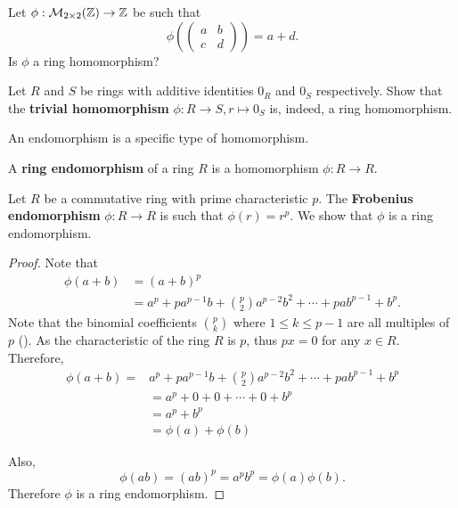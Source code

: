 \begin{exercise}
    Let $\phi: \mathcal{M}_{2\times2}(\mathbb{Z}) \to \mathbb{Z}$ be such that
    \[
        \phi\left(\begin{pmatrix}a&b\\c&d\end{pmatrix}\right) = a+d.
    \]
    Is $\phi$ a ring homomorphism?
\end{exercise}
\begin{exercise}
    Let $R$ and $S$ be rings with additive identities $0_R$ and $0_S$ respectively. Show that the \textbf{trivial homomorphism} $\phi: R \to S, r \mapsto 0_S$ is, indeed, a ring homomorphism.
\end{exercise}

An endomorphism is a specific type of homomorphism.
\begin{definition}
    A \textbf{ring endomorphism} of a ring $R$ is a homomorphism $\phi: R \to R$.
\end{definition}
\begin{example}
    Let $R$ be a commutative ring with prime characteristic $p$. The \textbf{Frobenius endomorphism} $\phi: R \to R$ is such that $\phi(r) = r^p$. We show that $\phi$ is a ring endomorphism.
    
    \begin{proof}
        Note that
        \begin{align*}
            \phi(a+b) &= (a+b)^p\\
            &= a^p + pa^{p-1}b + {p \choose 2}a^{p-2}b^2 + \cdots + pab^{p-1} + b^p.
        \end{align*}
        Note that the binomial coefficients ${p \choose k}$ where $1 \leq k \leq p-1$ are all multiples of $p$ (). As the characteristic of the ring $R$ is $p$, thus $px = 0$ for any $x \in R$. Therefore,
        \begin{align*}
            \phi(a+b) = &a^p + pa^{p-1}b + {p \choose 2}a^{p-2}b^2 + \cdots + pab^{p-1} + b^p\\
            &= a^p + 0 + 0 + \cdots + 0 + b^p\\
            &= a^p + b^p\\
            &=\phi(a) + \phi(b)
        \end{align*}

        Also,
        \[
            \phi(ab) = (ab)^p = a^pb^p = \phi(a)\phi(b).
        \]
        Therefore $\phi$ is a ring endomorphism.
    \end{proof}
\end{example}


